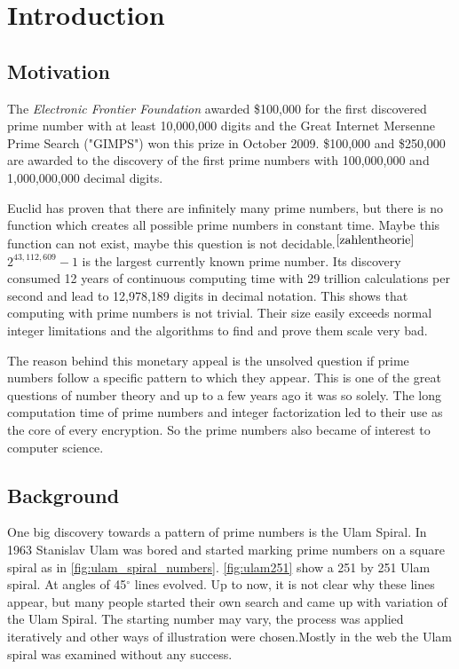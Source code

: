 \section{Introduction}
\label{sec:intro}

\subsection{Motivation}
The \emph{Electronic Frontier Foundation} awarded \$100,000 for the first discovered prime number with at least 10,000,000 digits and the Great Internet Mersenne Prime Search ("GIMPS") won this prize in October 2009. \$100,000 and \$250,000 are awarded to the discovery of the first prime numbers with 100,000,000 and 1,000,000,000 decimal digits.

Euclid has proven that there are infinitely many prime numbers, but there is no function which creates all possible prime numbers in constant time. Maybe this function can not exist, maybe this question is not decidable.$^{\cite{zahlentheorie}}$ $2^{43,112,609}-1$ is the largest currently known prime number. Its discovery consumed 12 years of continuous computing time with 29 trillion calculations per second and lead to 12,978,189 digits in decimal notation. This shows that computing with prime numbers is not trivial. Their size easily exceeds normal integer limitations and the algorithms to find and prove them scale very bad.

The reason behind this monetary appeal is the unsolved question if prime numbers follow a specific pattern to which they appear. This is one of the great questions of number theory and up to a few years ago it was so solely. The long computation time of prime numbers and integer factorization led to their use as the core of every encryption. So the prime numbers also became of interest to computer science.

\subsection{Background}
One big discovery towards a pattern of prime numbers is the Ulam Spiral. In 1963 Stanislav Ulam was bored and started marking prime numbers on a square spiral as in \ref{fig:ulam_spiral_numbers}. \ref{fig:ulam251} show a 251 by 251 Ulam spiral. At angles of 45$^\circ$ lines evolved. Up to now, it is not clear why these lines appear, but many people started their own search and came up with variation of the Ulam Spiral. The starting number may vary, the process was applied iteratively and other ways of illustration were chosen.Mostly in the web the Ulam spiral was examined without any success.

